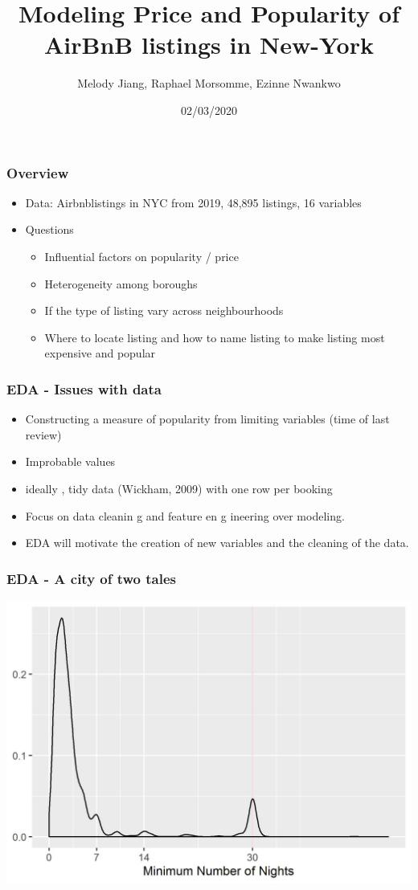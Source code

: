 \documentclass{beamer}
\title{Modeling Price and Popularity of AirBnB listings in New-York}
\author{Melody Jiang, Raphael Morsomme, Ezinne Nwankwo}
\institute{Department of Statistical Science, Duke University}
\date{02/03/2020}
\begin{document}
\frame{\titlepage}





\begin{frame}
\frametitle{Overview}

\begin{itemize}
\item Data: Airbnblistings in NYC from 2019, 48,895 listings, 16 variables

\item Questions
\begin{itemize}
    \item Influential factors on popularity / price
    \item Heterogeneity among boroughs
    \item If the type of listing vary across neighbourhoods
    \item Where to locate listing and how to name listing to make listing most expensive and popular
\end{itemize}


\end{itemize}

\end{frame}

\begin{frame}
    \frametitle{EDA - Issues with data}
    \begin{itemize}
        \item Constructing a measure of popularity from limiting variables (time of last review)
        \item Improbable values
        \item ideally , tidy data (Wickham, 2009) with one row per booking
        \item Focus on data cleanin g and feature en g ineering over modeling.
        \item EDA will motivate the creation of new variables and the cleaning of the data.
    \end{itemize}
\end{frame}

\begin{frame}
    \frametitle{EDA - A city of two tales}

    
    \includegraphics[scale = 0.8]{length_stay_density.jpeg}
\end{frame}
\end{document}
